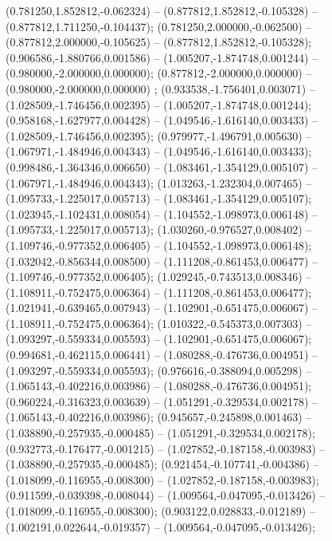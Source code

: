  (0.781250,1.852812,-0.062324) -- (0.877812,1.852812,-0.105328) -- (0.877812,1.711250,-0.104437);
 (0.781250,2.000000,-0.062500) -- (0.877812,2.000000,-0.105625) -- (0.877812,1.852812,-0.105328);
 (0.906586,-1.880766,0.001586) -- (1.005207,-1.874748,0.001244) -- (0.980000,-2.000000,0.000000);
 (0.877812,-2.000000,0.000000) -- (0.980000,-2.000000,0.000000) ;
 (0.933538,-1.756401,0.003071) -- (1.028509,-1.746456,0.002395) -- (1.005207,-1.874748,0.001244);
 (0.958168,-1.627977,0.004428) -- (1.049546,-1.616140,0.003433) -- (1.028509,-1.746456,0.002395);
 (0.979977,-1.496791,0.005630) -- (1.067971,-1.484946,0.004343) -- (1.049546,-1.616140,0.003433);
 (0.998486,-1.364346,0.006650) -- (1.083461,-1.354129,0.005107) -- (1.067971,-1.484946,0.004343);
 (1.013263,-1.232304,0.007465) -- (1.095733,-1.225017,0.005713) -- (1.083461,-1.354129,0.005107);
 (1.023945,-1.102431,0.008054) -- (1.104552,-1.098973,0.006148) -- (1.095733,-1.225017,0.005713);
 (1.030260,-0.976527,0.008402) -- (1.109746,-0.977352,0.006405) -- (1.104552,-1.098973,0.006148);
 (1.032042,-0.856344,0.008500) -- (1.111208,-0.861453,0.006477) -- (1.109746,-0.977352,0.006405);
 (1.029245,-0.743513,0.008346) -- (1.108911,-0.752475,0.006364) -- (1.111208,-0.861453,0.006477);
 (1.021941,-0.639465,0.007943) -- (1.102901,-0.651475,0.006067) -- (1.108911,-0.752475,0.006364);
 (1.010322,-0.545373,0.007303) -- (1.093297,-0.559334,0.005593) -- (1.102901,-0.651475,0.006067);
 (0.994681,-0.462115,0.006441) -- (1.080288,-0.476736,0.004951) -- (1.093297,-0.559334,0.005593);
 (0.976616,-0.388094,0.005298) -- (1.065143,-0.402216,0.003986) -- (1.080288,-0.476736,0.004951);
 (0.960224,-0.316323,0.003639) -- (1.051291,-0.329534,0.002178) -- (1.065143,-0.402216,0.003986);
 (0.945657,-0.245898,0.001463) -- (1.038890,-0.257935,-0.000485) -- (1.051291,-0.329534,0.002178);
 (0.932773,-0.176477,-0.001215) -- (1.027852,-0.187158,-0.003983) -- (1.038890,-0.257935,-0.000485);
 (0.921454,-0.107741,-0.004386) -- (1.018099,-0.116955,-0.008300) -- (1.027852,-0.187158,-0.003983);
 (0.911599,-0.039398,-0.008044) -- (1.009564,-0.047095,-0.013426) -- (1.018099,-0.116955,-0.008300);
 (0.903122,0.028833,-0.012189) -- (1.002191,0.022644,-0.019357) -- (1.009564,-0.047095,-0.013426);

